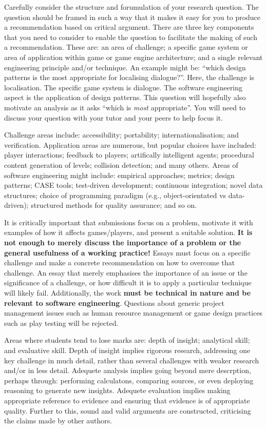 \documentclass{../../../fal_assignment}
\begin{document}
Carefully consider the structure and forumulation of your research question. The question should be framed in such a way that it makes it easy for you to produce a recommendation based on critical argument. There are three key components that you need to consider to enable the question to facilitate the making of such a recommendation. These are: an area of challenge; a specific game system or area of application within game or game engine architecture; and a single relevant engineering principle and/or technique. An example might be: ``which design patterns is the most appropriate for localising dialogue?''. Here, the challenge is localisation. The specific game system is dialogue. The software engineering aspect is the application of design patterns. This question will hopefully also motivate an analysis as it asks ``which is \textit{most} appropriate''. You will need to discuss your question with your tutor and your peers to help focus it.

Challenge areas include: accessibility; portability; internationalisation; and verification. Application areas are numerous, but popular choices have included: player interactions; feedback to players; artifically intelligent agents; procedural content generation of levels; collision detection; and many others. Areas of software engineering might include: empirical approaches; metrics; design patterns; CASE tools; test-driven development; continuous integration; novel data structures; choice of programming paradigm (e.g., object-orientated vs data-driven); structured methods for quality assurance; and so on.

It is critically important that submissions focus on a problem, motivate it with examples of how it affects games/players, and present a suitable solution. \textbf{It is not enough to merely discuss the importance of a problem or the general usefulness of a working practice!} Essays must focus on a specific challenge and make a concrete recommendation on how to overcome that challenge. An essay that merely emphasises the importance of an issue or the significance of a challenge, or how difficult it is to apply a particular technique will likely fail. Additionally, the work \textbf{must be technical in nature and be relevant to software engineering}. Questions about generic project management issues such as human resource management or game design practices such as play testing will be rejected.

Areas where students tend to lose marks are: depth of insight; analytical skill; and evaluative skill. Depth of insight implies rigorous research, addressing one key challenge in much detail, rather than several challenges with weaker research and/or in less detail. Adequete analysis implies going beyond mere descrption, perhaps through: performing calculatons, comparing sources, or even deploying reasoning to generate new insights. Adequete evaluation implies making appropriate reference to evidence and ensuring that evidence is of appropriate quality. Further to this, sound and valid arguments are constructed, criticising the claims made by other authors.
\end{document}
